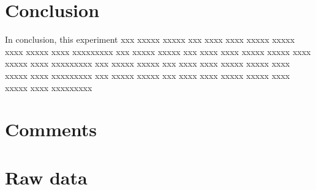 \documentclass[12pt]{article}
\begin{document}
    \section{Conclusion}
    In conclusion, this experiment 
    xxx xxxxx xxxxx xxx xxxx xxxx xxxxx xxxxx xxxx xxxxx xxxx
    xxxxxxxxx xxx xxxxx xxxxx xxx xxxx xxxx xxxxx xxxxx xxxx xxxxx xxxx xxxxxxxxx
    xxx xxxxx xxxxx xxx xxxx xxxx xxxxx xxxxx xxxx xxxxx xxxx xxxxxxxxx
    xxx xxxxx xxxxx xxx xxxx xxxx xxxxx xxxxx xxxx xxxxx xxxx xxxxxxxxx

		\section{Comments}

    
    

    \appendix
    \cleardoublepage

    \section{Raw data}
    \label{app:data}
    
\end{document}

